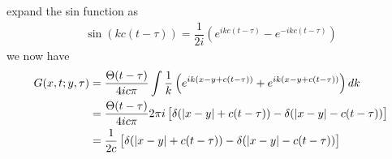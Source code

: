\documentclass{article}
\newcommand{\f}[2]{\dfrac{#1}{#2}}
\begin{document}
expand the sin function as
\begin{gather}
	\sin(kc (t - \tau)) = \f{1}{2i} \left( e^{ikc (t - \tau)} - e^{-ikc (t - \tau)} \right)
\end{gather}	
we now have
\begin{equation}
	\begin{aligned}
		G(x,t;y,\tau)
		& = \f{\Theta(t - \tau)}{4 i c\pi} \int \f{1}{k} \left( e^{i k(x - y + c(t - \tau))} + e^{i k(x - y + c(t - \tau))} \right) dk\\
		& = \f{\Theta(t - \tau)}{4 i c\pi} 2\pi i \left[ \delta( \abs{{x - y}} + c(t - \tau)) - \delta( \abs{{x - y}} - c(t - \tau)) \right]\\
		&= \f{1}{2c} \left[ \delta( \abs{{x - y}} + c(t - \tau)) - \delta( \abs{{x - y}} - c(t - \tau)) \right]
	\end{aligned}
\end{equation}

	
	
	
	
	
	
	
	
	
	
	
	
	
	
	
	
	
	
	
	
	
	
	
	
	
	
	
	
	
	
	
	
	
	
	
	
	
	
	
	
	
	
	
	
	
	
	
	
	
	
	
	
	
	
	
	
	
	
	
	
	
	
	
	
	
	
	
	
	
	
	
	
	
	
\end{document}
